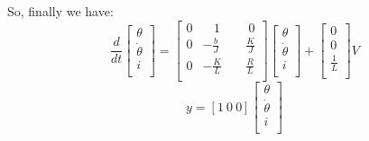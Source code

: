 So, finally we have:
\begin{equation}
    \frac{d}{dt}\left[\begin{matrix}\theta\\\dot{\theta}\\i\\\end{matrix}\right]=\left[\begin{matrix}0&\ \ \ \ 1&\ \ \ \ \ \ 0\\0&-\frac{b}{J}&\ \ \ \ \ \frac{K}{J}\\0&-\frac{K}{L}&\ \ \ \ \ \frac{R}{L}\\\end{matrix}\right]\left[\begin{matrix}\theta\\\dot{\theta}\\i\\\end{matrix}\right]+\left[\begin{matrix}0\\0\\\frac{1}{L}\\\end{matrix}\right]V
    \label{eq:State_space_3}
\end{equation}
\[y=[1\ 0\ 0]\left[\begin{matrix}\theta\\\dot{\theta}\\i\\\end{matrix}\right]\]

